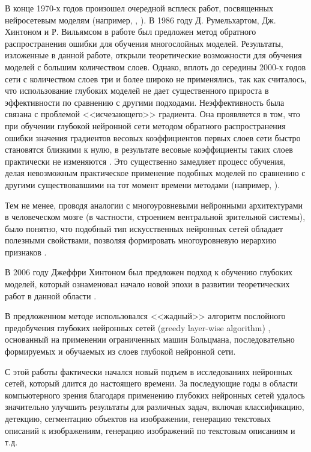 В конце 1970-х годов произошел очередной всплеск работ, посвященных нейросетевым моделям (например, \cite{Grossberg1976}, \cite{Kohonen1977}).
В 1986 году Д. Румельхартом, Дж. Хинтоном и Р. Вильямсом в работе \cite{rumelhart1986learning} был предложен метод обратного распространения ошибки для обучения многослойных моделей. Результаты, изложенные в данной работе, открыли теоретические возможности для обучения моделей с большим количеством слоев.  Однако, вплоть до середины 2000-х годов сети с количеством слоев три и более широко не применялись, так как считалось, что использование глубоких моделей не дает существенного прироста в эффективности по сравнению с другими подходами. Неэффективность была связана с проблемой <<исчезающего>> градиента. Она проявляется в том, что при обучении глубокой нейронной сети методом обратного распространения ошибки значения градиентов весовых коэффициентов первых слоев сети быстро становятся близкими к нулю, в результате весовые коэффициенты таких слоев практически не изменяются \cite{n5}. Это существенно замедляет процесс обучения, делая невозможным практическое применение подобных моделей по сравнению с другими существовавшими на тот момент времени методами (например, \cite{Corinna1995}).

Тем не менее, проводя аналогии с многоуровневыми нейронными архитектурами в человеческом мозге (в частности, строением вентральной зрительной системы), было понятно, что подобный тип искусственных нейронных сетей обладает полезными свойствами, позволяя формировать многоуровневую иерархию признаков \cite{Behnke2003}.

В 2006 году Джеффри Хинтоном был предложен подход к обучению глубоких моделей, который ознаменовал начало новой эпохи в развитии теоретических работ в данной области \cite{n1}.

В предложенном методе использовался <<жадный>> алгоритм послойного предобучения глубоких нейронных сетей (greedy layer-wise algorithm) \cite{Hinton2009}, основанный на применении ограниченных машин Больцмана, последовательно формируемых и обучаемых из слоев глубокой нейронной сети. 

С этой работы фактически начался новый подъем в исследованиях нейронных сетей, который длится до настоящего времени. За последующие годы в области компьютерного зрения благодаря применению глубоких нейронных сетей удалось значительно улучшить результаты для различных задач, включая классификацию, детекцию, сегментацию объектов на изображении, генерацию текстовых описаний к изображениям, генерацию изображений по текстовым описаниям и т.д.  %

